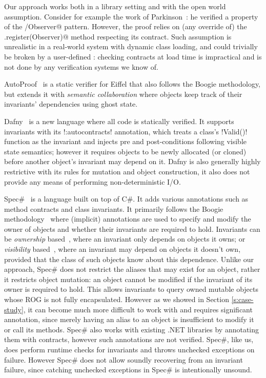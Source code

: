 Our approach works both  in a library setting and with the open world assumption.
Consider for example the work of Parkinson~\cite{parkinson2007class}: he verified a property of the \Q@Subject/Observer@ pattern. However, the proof relies on (any override of) the \Q@Subject.register(Observer)@ method respecting its contract. Such assumption is unrealistic in a real-world system with dynamic class loading, and could trivially be broken by a user-defined \Q@EvilSubject@: checking contracts at load time is impractical and is not done by any verification systems we know of.

AutoProof~\cite{DBLP:conf/fm/PolikarpovaTFM14} is a static verifier for Eiffel that also follows the Boogie methodology, but extends it with \emph{semantic collaboration} where objects keep track of their invariants' dependencies using ghost state.

Dafny~\cite{DBLP:conf/sigada/Leino12} is a new language where all code is statically verified. It supports invariants with its \Q!{:autocontracts}! annotation, which treats a class's \Q!Valid()! function as the invariant and injects pre and post-conditions following visible state semantics;
however it requires objects to be newly allocated (or cloned) before another object's invariant may depend on it.
Dafny is also generally highly restrictive with its rules for mutation and object construction, it also does not provide any means of performing 
non-deterministic I/O.

Spec\#~\cite{Barnett:2004:SPS:2131546.2131549} is a language built on top of C\#. It adds various annotations such as method contracts and class invariants. 
It primarily follows the Boogie methodology~\cite{DBLP:journals/tcs/NaumannB06} where (implicit) annotations are used to specify and modify the owner of objects and whether their invariants are required to hold. Invariants can be \emph{ownership} based~\cite{DBLP:journals/jot/BarnettDFLS04}, where an invariant only depends on objects it owns; or \emph{visibility} based~\cite{DBLP:conf/mpc/BarnettN04,DBLP:conf/ecoop/LeinoM04}, where an invariant may depend on objects it doesn't own, provided that the class of such objects know about this dependence. Unlike our approach, Spec\# does not restrict the aliases that may exist for an object, rather it restricts object mutation: an object cannot be modified if the invariant of its owner is required to hold. This 
allows invariants to query owned mutable objects whose ROG is not fully encapsulated. However as we showed in Section \ref{s:case-study}, it can become much more difficult to work with and requires significant annotation, since merely having an alias to an object
is insufficient to modify it or call its methods.
Spec\# also works with existing .NET libraries by annotating them with contracts, however such annotations are not verified. Spec\#, like us, does perform runtime checks for invariants and throws unchecked exceptions on failure.  However Spec\# does not allow soundly recovering from an invariant failure, since catching unchecked exceptions in Spec\# is intentionally unsound.~\cite{Leino2004ExceptionSF}





